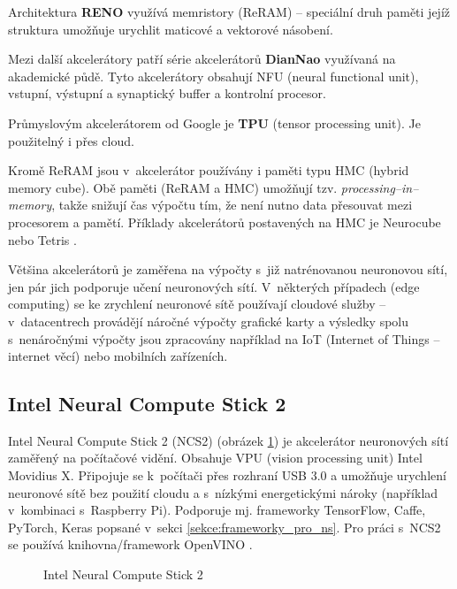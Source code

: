 Architektura \textbf{RENO} využívá memristory (ReRAM) -- speciální druh paměti jejíž struktura umožňuje urychlit maticové a vektorové násobení.

Mezi další akcelerátory patří série akcelerátorů \textbf{DianNao} využívaná na akademické půdě. Tyto akcelerátory obsahují NFU (neural functional unit), vstupní, výstupní a synaptický buffer a kontrolní procesor.

Průmyslovým akcelerátorem od Google je \textbf{TPU} (tensor processing unit). Je použitelný i přes cloud.

Kromě ReRAM jsou v~akcelerátor používány i paměti typu HMC (hybrid memory cube). Obě paměti (ReRAM a HMC) umožňují tzv. \emph{processing--in--memory}, takže snižují čas výpočtu tím, že není nutno data přesouvat mezi procesorem a pamětí. Příklady akcelerátorů postavených na HMC je Neurocube \cite{neurocube} nebo Tetris \cite{tetris}.

Většina akcelerátorů je zaměřena na výpočty s~již natrénovanou neuronovou sítí, jen pár jich podporuje učení neuronových sítí. V~některých případech (edge computing) se ke zrychlení neuronové sítě používají cloudové služby -- v~datacentrech provádějí náročné výpočty grafické karty a výsledky spolu s~nenáročnými výpočty jsou zpracovány například na IoT (Internet of Things -- internet věcí) nebo mobilních zařízeních.

\subsection*{Intel Neural Compute Stick 2}

Intel Neural Compute Stick 2 (NCS2) \cite{ncs2} (obrázek \ref{obrazek:ncs2}) je akcelerátor neuronových sítí zaměřený na počítačové vidění. Obsahuje VPU (vision processing unit) Intel Movidius X. Připojuje se k~počítači přes rozhraní USB 3.0 a umožňuje urychlení neuronové sítě bez použití cloudu a s~nízkými energetickými nároky (například v~kombinaci s~Raspberry Pi). Podporuje mj. frameworky TensorFlow, Caffe, PyTorch, Keras popsané v~sekci \ref{sekce:frameworky_pro_ns}. Pro práci s~NCS2 se používá knihovna/framework OpenVINO \cite{openvino}. 

\begin{figure}[H]
  \begin{center}
  \label{obrazek:ncs2}
  \caption{Intel Neural Compute Stick 2 \cite{ncs2}}
  \end{center}
\end{figure}


